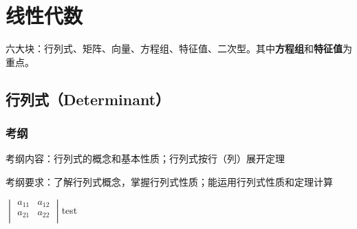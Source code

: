 \section{线性代数}
\begin{intro}
    六大块：行列式、矩阵、向量、方程组、特征值、二次型。其中\textbf{方程组}和\textbf{特征值}为重点。
\end{intro}

\subsection{行列式（Determinant）}
\subsubsection{考纲}
考纲内容：行列式的概念和基本性质；行列式按行（列）展开定理

考纲要求：了解行列式概念，掌握行列式性质；能运用行列式性质和定理计算

$
\begin{vmatrix}
    a_{11} & a_{12} \\
    a_{21} & a_{22} \\
\end{vmatrix}
$test
